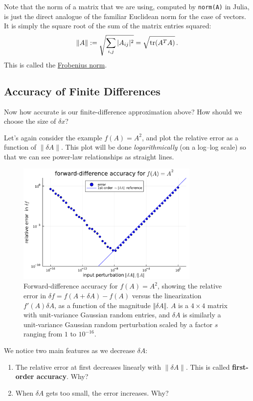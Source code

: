 \begin{definition}  
Note that the norm of a matrix that we are using, computed by \texttt{norm(A)} in Julia, is just the direct analogue of the familiar Euclidean norm for the case of vectors. It is simply the square root of the sum of the matrix entries squared:
\[
\lVert A \rVert := \sqrt{\sum_{i,j} |A_{ij}|^2} = \sqrt{\operatorname{tr} (A^T A)} \, .
\]
This is called the \href{https://mathworld.wolfram.com/FrobeniusNorm.html}{Frobenius norm}.
\end{definition}

\subsection{Accuracy of Finite Differences}

Now how accurate is our finite-difference approximation above? How should we choose the size of $\delta x$?

Let's again consider the example $f(A) = A^2$, and plot the relative error as a function of $\lVert \delta A \rVert$. This plot will be done \textit{logarithmically} (on a log--log scale) so that we can see power-law relationships as straight lines.
\begin{figure}
    \centering
    \includegraphics[width=0.8\textwidth]{figures/fig1}
    \caption{Forward-difference accuracy for $f(A) = A^2$, showing the relative error in $\delta f = f(A + \delta A) - f(A)$ versus the  linearization $f'(A) \delta A$, as a function of the magnitude $\Vert \delta A\Vert$.  $A$ is a $4 \times 4$ matrix with unit-variance Gaussian random entries, and $\delta A$ is similarly a unit-variance Gaussian random perturbation scaled by a factor $s$ ranging from $1$ to $10^{-16}$.}
\end{figure}

We notice two main features as we decrease $\delta A$:
\begin{enumerate}
    \item The relative error at first decreases linearly with $\lVert \delta A\rVert$. This is called \textbf{first-order accuracy}. Why?
    \item When $\delta A$ gets too small, the error increases. Why?
\end{enumerate}

